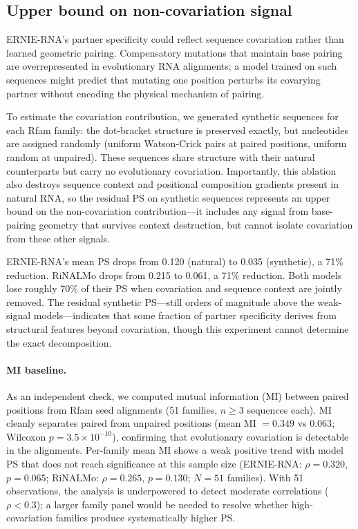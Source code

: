 \documentclass[11pt]{article}
\begin{document}
\subsection{Upper bound on non-covariation signal}

ERNIE-RNA's partner specificity could reflect sequence covariation
rather than learned geometric pairing. Compensatory mutations that
maintain base pairing are overrepresented in evolutionary RNA
alignments; a model trained on such sequences might predict that
mutating one position perturbs its covarying partner without encoding
the physical mechanism of pairing.

To estimate the covariation contribution, we generated synthetic
sequences for each Rfam family: the dot-bracket structure is
preserved exactly, but nucleotides are assigned randomly (uniform
Watson-Crick pairs at paired positions, uniform random at unpaired).
These sequences share structure with their natural counterparts but
carry no evolutionary covariation. Importantly, this ablation also
destroys sequence context and positional composition gradients
present in natural RNA, so the residual PS on synthetic sequences
represents an upper bound on the non-covariation contribution---it
includes any signal from base-pairing geometry that survives context
destruction, but cannot isolate covariation from these other signals.

ERNIE-RNA's mean PS drops from 0.120 (natural) to 0.035 (synthetic),
a 71\% reduction. RiNALMo drops from 0.215 to 0.061, a 71\%
reduction. Both models lose roughly 70\% of their PS when covariation
and sequence context are jointly removed. The residual synthetic
PS---still orders of magnitude above the weak-signal
models---indicates that some fraction of partner specificity
derives from structural features beyond covariation, though this
experiment cannot determine the exact decomposition.

\paragraph{MI baseline.}
As an independent check, we computed mutual information (MI) between
paired positions from Rfam seed alignments (51 families, $n \geq 3$
sequences each). MI cleanly separates paired from unpaired positions
(mean MI $= 0.349$ vs $0.063$; Wilcoxon $p = 3.5 \times 10^{-10}$),
confirming that evolutionary covariation is detectable in the
alignments. Per-family mean MI shows a weak positive trend with
model PS that does not reach significance at this sample size
(ERNIE-RNA: $\rho = 0.320$, $p = 0.065$; RiNALMo:
$\rho = 0.265$, $p = 0.130$; $N = 51$ families). With 51
observations, the analysis is underpowered to detect moderate
correlations ($\rho < 0.3$); a larger family panel would be
needed to resolve whether high-covariation families produce
systematically higher PS.
\end{document}
